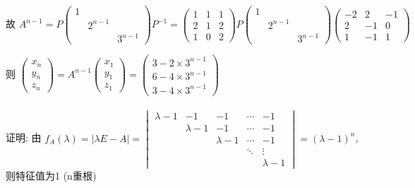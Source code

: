          \( \text{故 } A^{n-1}  = P\begin{pmatrix}
             1 &         &         \\
               & 2^{n-1} &         \\
               &         & 3^{n-1}
         \end{pmatrix}P^{-1}
         = \begin{pmatrix}
             1 & 1 & 1 \\
             2 & 1 & 2 \\
             1 & 0 & 2
         \end{pmatrix}P\begin{pmatrix}
             1 &         &         \\
               & 2^{n-1} &         \\
               &         & 3^{n-1}
         \end{pmatrix}\begin{pmatrix}
             -2 & 2  & -1 \\
             2  & -1 & 0  \\
             1  & -1 & 1
         \end{pmatrix}\)

         则 \( \begin{pmatrix}
             x_{n} \\
             y_{n} \\
             z_{n}
         \end{pmatrix} = A^{n-1}\begin{pmatrix}
             x_{1} \\
             y_{1} \\
             z_{1}
         \end{pmatrix} = \begin{pmatrix}
             3-2\times3^{n-1} \\
             6-4\times3^{n-1} \\
             3-4\times3^{n-1}
         \end{pmatrix} \)


     \paragraph{} %
         证明: 由 \( f_{A}(\lambda) = |\lambda E - A| = \begin{vmatrix}
             \lambda-1 & -1        & -1        & \cdots & -1        \\
                       & \lambda-1 & -1        & \cdots & -1        \\
                       &           & \lambda-1 & \cdots & -1        \\
                       &           &           & \ddots & \vdots    \\
                       &           &           &        & \lambda-1
         \end{vmatrix} = (\lambda-1)^{n} \), 则特征值为1 (n重根)

